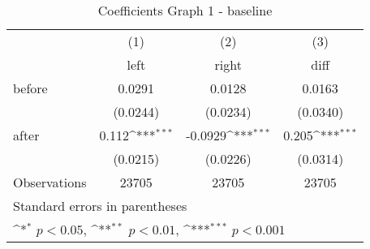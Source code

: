 \begin{table}[!ht]\centering \footnotesize
\def\sym#1{\ifmmode^{#1}\else\(^{#1}\)\fi}
\caption{Coefficients Graph 1 - baseline}
\begin{tabular}{l*{3}{c}}
\hline\hline
                   &\multicolumn{1}{c}{(1)}&\multicolumn{1}{c}{(2)}&\multicolumn{1}{c}{(3)}\\
                    &\multicolumn{1}{c}{left}&\multicolumn{1}{c}{right}&\multicolumn{1}{c}{diff}\\
\hline
before              &      0.0291         &      0.0128         &      0.0163         \\
                    &    (0.0244)         &    (0.0234)         &    (0.0340)         \\
[0.5em]
after               &       0.112\sym{***}&     -0.0929\sym{***}&       0.205\sym{***}\\
                    &    (0.0215)         &    (0.0226)         &    (0.0314)         \\
\hline
Observations        &       23705         &       23705         &       23705         \\
\hline\hline
\multicolumn{4}{l}{\footnotesize Standard errors in parentheses}\\
\multicolumn{4}{l}{\footnotesize \sym{*} \(p<0.05\), \sym{**} \(p<0.01\), \sym{***} \(p<0.001\)}\\
\end{tabular}
\end{table}
